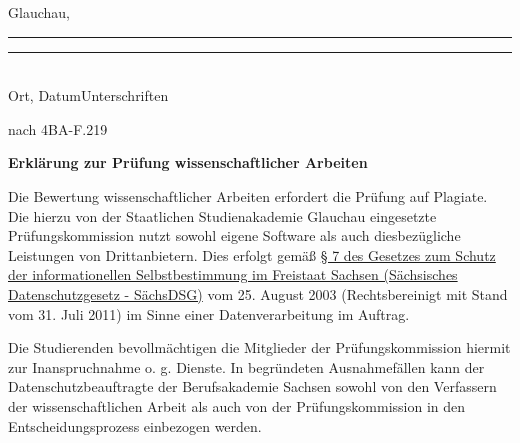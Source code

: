     Glauchau, \abgabedatum\newline\noindent\rule{0.35\columnwidth}{0.4pt}\hspace{0.05\columnwidth}\rule{0.6\columnwidth}{0.4pt}\\
    Ort, Datum\hspace{0.27\columnwidth}Unterschriften


    \newpage
{}
\rohead{}
    
    \vspace*{2mm}

    \begin{minipage}{0.5\columnwidth}
        
    \end{minipage}
    \begin{minipage}{0.45\columnwidth}
        \begin{flushright}
            {\small nach 4BA-F.219\\}
        \end{flushright}
    \end{minipage}
    \vspace*{2mm}

    \begin{center}
        \textbf{\huge{Erklärung zur Prüfung wissenschaftlicher Arbeiten}}
    \end{center}

    Die Bewertung wissenschaftlicher Arbeiten erfordert die Prüfung auf Plagiate. Die hierzu von der Staatlichen Studienakademie Glauchau eingesetzte Prüfungskommission nutzt sowohl eigene Software als auch diesbezügliche Leistungen von Drittanbietern. Dies erfolgt gemäß \href{https://www.revosax.sachsen.de/vorschrift/1672-Saechsisches-Datenschutzgesetz#p7}{§ 7 des Gesetzes zum Schutz der informationellen Selbstbestimmung im Freistaat Sachsen (Sächsisches Datenschutzgesetz - SächsDSG)} vom 25. August 2003 (Rechtsbereinigt mit Stand vom 31. Juli 2011) im Sinne einer Datenverarbeitung im Auftrag.

    Die Studierenden bevollmächtigen die Mitglieder der Prüfungskommission hiermit zur Inanspruchnahme o. g. Dienste. In begründeten Ausnahmefällen kann der Datenschutzbeauftragte der Berufsakademie Sachsen sowohl von den Verfassern der wissenschaftlichen Arbeit als auch von der Prüfungskommission in den Entscheidungsprozess einbezogen werden.

    \arrayrulewidth=0.5pt
